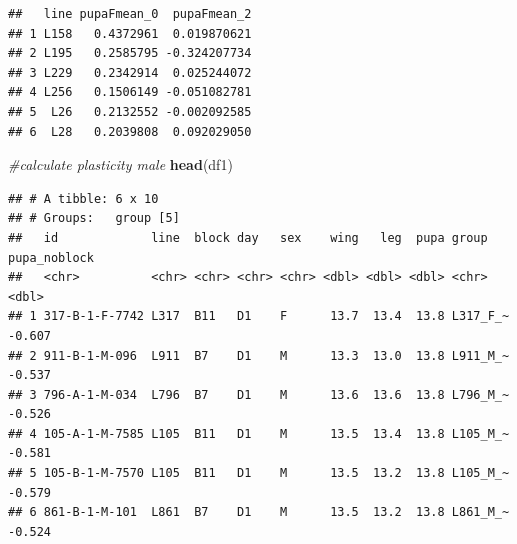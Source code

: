 \documentclass[
]{article}
\newenvironment{Shaded}{\begin{snugshade}}{\end{snugshade}}
\newcommand{\CommentTok}[1]{\textcolor[rgb]{0.56,0.35,0.01}{\textit{#1}}}
\newcommand{\DecValTok}[1]{\textcolor[rgb]{0.00,0.00,0.81}{#1}}
\newcommand{\KeywordTok}[1]{\textcolor[rgb]{0.13,0.29,0.53}{\textbf{#1}}}
\newcommand{\NormalTok}[1]{#1}
\newcommand{\OperatorTok}[1]{\textcolor[rgb]{0.81,0.36,0.00}{\textbf{#1}}}
\newcommand{\StringTok}[1]{\textcolor[rgb]{0.31,0.60,0.02}{#1}}
\begin{document}
\begin{verbatim}
##   line pupaFmean_0  pupaFmean_2
## 1 L158   0.4372961  0.019870621
## 2 L195   0.2585795 -0.324207734
## 3 L229   0.2342914  0.025244072
## 4 L256   0.1506149 -0.051082781
## 5  L26   0.2132552 -0.002092585
## 6  L28   0.2039808  0.092029050
\end{verbatim}

\begin{Shaded}
\end{Shaded}

\begin{Shaded}
\begin{Highlighting}[]
\CommentTok{#calculate plasticity male}
\KeywordTok{head}\NormalTok{(df1)}
\end{Highlighting}
\end{Shaded}

\begin{verbatim}
## # A tibble: 6 x 10
## # Groups:   group [5]
##   id             line  block day   sex    wing   leg  pupa group    pupa_noblock
##   <chr>          <chr> <chr> <chr> <chr> <dbl> <dbl> <dbl> <chr>           <dbl>
## 1 317-B-1-F-7742 L317  B11   D1    F      13.7  13.4  13.8 L317_F_~       -0.607
## 2 911-B-1-M-096  L911  B7    D1    M      13.3  13.0  13.8 L911_M_~       -0.537
## 3 796-A-1-M-034  L796  B7    D1    M      13.6  13.6  13.8 L796_M_~       -0.526
## 4 105-A-1-M-7585 L105  B11   D1    M      13.5  13.4  13.8 L105_M_~       -0.581
## 5 105-B-1-M-7570 L105  B11   D1    M      13.5  13.2  13.8 L105_M_~       -0.579
## 6 861-B-1-M-101  L861  B7    D1    M      13.5  13.2  13.8 L861_M_~       -0.524
\end{verbatim}

\begin{Shaded}
\end{Shaded}
\end{document}
